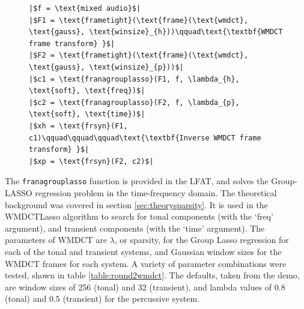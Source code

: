 \documentclass[letter,12pt]{article}
\newlength{\mintednumbersep}
\begin{document}
\begin{figure}[h]
  \centering
  \centering
\begin{verbatim}
|$f = \text{mixed audio}$|
|$F1 = \text{frametight}(\text{frame}(\text{wmdct}, \text{gauss}, \text{winsize}_{h}))\qquad\text{\textbf{WMDCT frame transform} }$|
|$F2 = \text{frametight}(\text{frame}(\text{wmdct}, \text{gauss}, \text{winsize}_{p}))$|
|$c1 = \text{franagrouplasso}(F1, f, \lambda_{h}, \text{soft}, \text{freq})$|
|$c2 = \text{franagrouplasso}(F2, f, \lambda_{p}, \text{soft}, \text{time})$|
|$xh = \text{frsyn}(F1, c1)\qquad\qquad\qquad\text{\textbf{Inverse WMDCT frame transform} }$|
|$xp = \text{frsyn}(F2, c2)$|
\end{verbatim}
  \label{lst:wmdctlasso}
\end{figure}

The \Verb#franagrouplasso# function is provided in the LFAT, and solves the Group-LASSO regression problem in the time-frequency domain. The theoretical background was covered in section \ref{sec:theorysparsity}. It is used in the WMDCTLasso algorithm to search for tonal components (with the `freq' argument), and transient components (with the `time' argument). The parameters of WMDCT are $\lambda$, or sparsity, for the Group Lasso regression for each of the tonal and transient systems, and Gaussian window sizes for the WMDCT frames for each system. A variety of parameter combinations were tested, shown in table \ref{table:round2wmdct}. The defaults, taken from the demo, are window sizes of 256 (tonal) and 32 (transient), and lambda values of 0.8 (tonal) and 0.5 (transient) for the percussive system.
\end{document}
